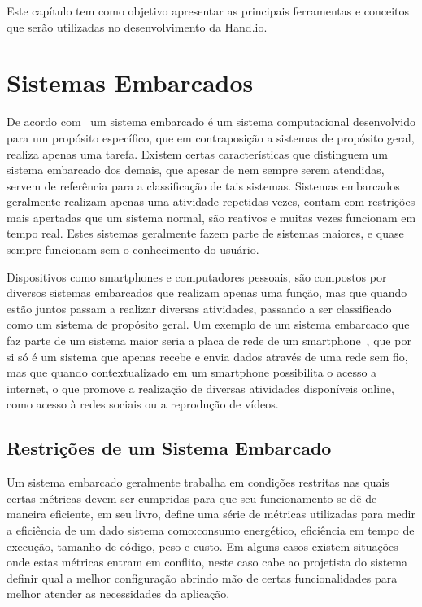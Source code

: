 \label{chapter:conceitos}
Este capítulo tem como objetivo apresentar as principais ferramentas e conceitos que serão utilizadas no desenvolvimento da Hand.io. 


\section{Sistemas Embarcados}%
De acordo com~\cite{VAHID:2001} um sistema embarcado é um sistema computacional desenvolvido para um propósito específico, que em contraposição a sistemas de propósito geral, realiza apenas uma tarefa. Existem certas características que distinguem um sistema embarcado dos demais, que apesar de nem sempre serem atendidas, servem de referência para a classificação de tais sistemas. Sistemas embarcados geralmente realizam apenas uma atividade repetidas vezes, contam com restrições mais apertadas que um sistema normal, são reativos e muitas vezes funcionam em tempo real. Estes sistemas geralmente fazem parte de sistemas maiores, e quase sempre funcionam sem o conhecimento do usuário.

Dispositivos como smartphones e computadores pessoais, são compostos por diversos sistemas embarcados que realizam apenas uma função, mas que quando estão juntos passam a realizar diversas atividades, passando a ser classificado como um sistema de propósito geral. Um exemplo de um sistema embarcado que faz parte de um sistema maior seria a placa de rede de um smartphone~\cite{qualcomm_2017}, que por si só é um sistema que apenas recebe e envia dados através de uma rede sem fio, mas que quando contextualizado em um smartphone possibilita o acesso a internet, o que promove a realização de diversas atividades disponíveis online, como acesso à redes sociais ou a reprodução de vídeos.


\subsection{Restrições de um Sistema Embarcado} %

Um sistema embarcado geralmente trabalha em condições restritas nas quais certas métricas devem ser cumpridas para que seu funcionamento se dê de maneira eficiente, em seu livro, \cite{marwedel:2011} define uma série de métricas utilizadas para medir a eficiência de um dado sistema como:consumo energético, eficiência em tempo de execução, tamanho de código, peso e custo. Em alguns casos existem situações onde estas métricas entram em conflito, neste caso cabe ao projetista do sistema definir qual a melhor configuração abrindo mão de certas funcionalidades para melhor atender as necessidades da aplicação.

